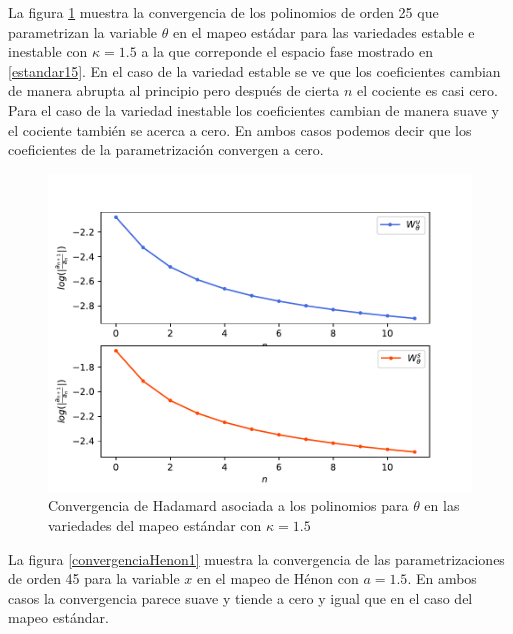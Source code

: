 La figura \ref{convergenciaEst15} muestra la convergencia de los polinomios de orden 25 que parametrizan la variable $\theta$ en el mapeo estádar para las variedades estable e inestable con $\kappa=1.5$ a la que correponde el espacio fase mostrado en \ref{estandar15}. En el caso de la variedad estable se ve que los coeficientes cambian de manera abrupta al principio pero después de cierta $n$ el cociente es casi cero. Para el caso de la variedad inestable los coeficientes cambian de manera suave y el cociente también se acerca a cero. En ambos casos podemos decir que los coeficientes de la parametrización convergen a cero.  
\begin{figure}[H]
\centering
\includegraphics[scale=0.5]{converEst15}
\caption{Convergencia de Hadamard asociada a los polinomios para $\theta$ en las variedades del mapeo estándar con $\kappa=1.5$}
\label{convergenciaEst15}
\end{figure}

La figura \ref{convergenciaHenon1} muestra la convergencia de las parametrizaciones de orden 45 para la variable $x$ en el mapeo de Hénon con $a=1.5$. En ambos casos la convergencia parece suave y tiende a cero y igual que en el caso del mapeo estándar.


